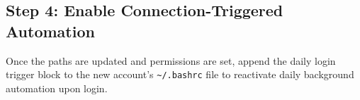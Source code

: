 \documentclass[11pt,a4paper]{article}
\begin{document}
\subsection{Step 4: Enable Connection-Triggered Automation}
Once the paths are updated and permissions are set, append the daily login trigger block to the new account's \verb|~/.bashrc| file to reactivate daily background automation upon login.
\end{document}
